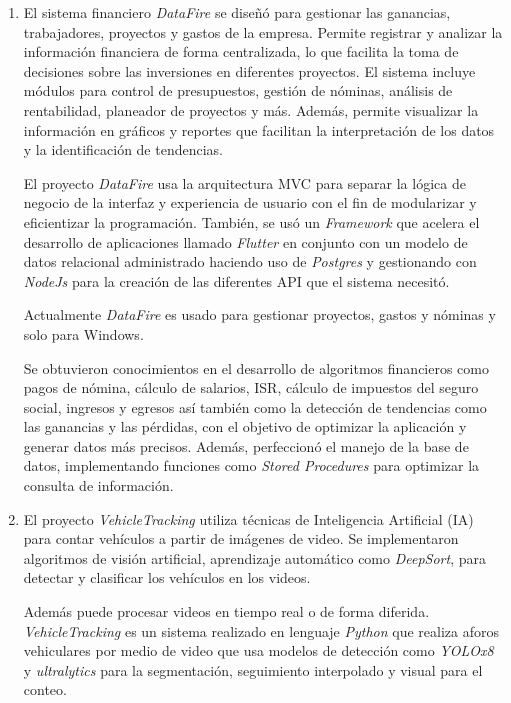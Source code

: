 \documentclass[protocolo.tex]{subfiles}
\begin{document}
\begin{enumerate}
\item El sistema financiero \textit{DataFire} se diseñó para gestionar las ganancias,  
trabajadores,  proyectos  y  gastos  de  la  empresa.  
Permite  registrar  y  analizar  la  información  financiera  de  forma  centralizada,  lo  que  facilita  
la  toma  de  decisiones  sobre  las  inversiones  en  diferentes  proyectos.  
El  sistema  incluye  módulos  para  control  de  presupuestos,  gestión  de  nóminas,  análisis  de  rentabilidad,
planeador de proyectos y más.  Además,  permite  visualizar  la  información  en  gráficos  y  
reportes  que  facilitan  la  interpretación  de  los  datos  y  la  identificación  de  tendencias.\vspace{5mm} 

El proyecto \textit{DataFire} usa la arquitectura MVC para separar la lógica de negocio de la interfaz y experiencia de usuario con el fin de modularizar y eficientizar la programación. 
También, se usó un \textit{Framework} que acelera el desarrollo de aplicaciones llamado \textit{Flutter} en conjunto con un modelo de datos relacional administrado haciendo uso de \textit{Postgres} 
y gestionando con \textit{NodeJs} para la creación de las diferentes API que el sistema necesitó.\vspace{5mm} 

Actualmente \textit{DataFire} es usado para gestionar proyectos, gastos y nóminas y
solo para Windows.

Se obtuvieron conocimientos en el desarrollo de algoritmos financieros como pagos de nómina, cálculo de salarios, ISR, cálculo de impuestos del seguro social, ingresos y egresos así también como la detección de tendencias como las ganancias y las pérdidas, con el objetivo de optimizar la aplicación y generar datos más precisos. Además,  perfeccionó el manejo de la base de datos, implementando funciones como \textit{Stored Procedures} para optimizar la consulta de información.

\item El proyecto \textit{VehicleTracking} utiliza técnicas de Inteligencia Artificial (IA) para  contar  vehículos  a  partir  de  imágenes  de  video.  Se  implementaron  algoritmos  de visión  artificial,  aprendizaje  automático como \textit{DeepSort}, para  detectar  y  clasificar  los  vehículos  en  los  videos.  

Además  puede  procesar  videos  en  tiempo  real  o  de  forma  diferida.
\textit{VehicleTracking} es un sistema realizado en lenguaje \textit{Python} que realiza aforos vehiculares por medio de video que usa modelos de detección como \textit{YOLOx8} y \textit{ultralytics} para la segmentación, seguimiento interpolado y visual para el conteo.\vspace{5mm} 



\end{enumerate}
\end{document}
